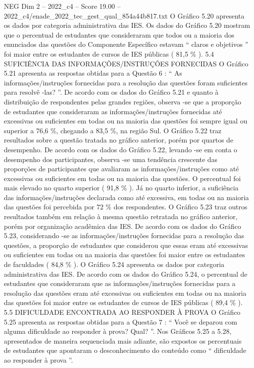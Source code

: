 \begin{textsample}{NEG Dim 2 – 2022\_c4 – Score 19.00 – 2022\_c4/enade\_2022\_tec\_gest\_qual\_854a44b817.txt}
O Gráfico 5.20 apresenta os dados por categoria administrativa das IES.
Os dados do Gráfico 5.20 mostram que o percentual de estudantes que consideraram que todos ou a maioria dos enunciados das questões do Componente Específico estavam “ claros e objetivos ” foi maior entre os estudantes de cursos de IES públicas ( 81,5 \% ). 5.4 SUFICIÊNCIA DAS INFORMAÇÕES/INSTRUÇÕES FORNECIDAS O Gráfico 5.21 apresenta as respostas obtidas para a Questão 6 : “ As informações/instruções fornecidas para a resolução das questões foram suficientes para resolvê -las? ”.
De acordo com os dados do Gráfico 5.21 e quanto à distribuição de respondentes pelas grandes regiões, observa -se que a proporção de estudantes que consideraram as informações/instruções fornecidas até excessivas ou suficientes em todas ou na maioria das questões foi sempre igual ou superior a 76,6 \%, chegando a 83,5 \%, na região Sul.
O Gráfico 5.22 traz resultados sobre a questão tratada no gráfico anterior, porém por quartos de desempenho.
De acordo com os dados do Gráfico 5.22, levando -se em conta o desempenho dos participantes, observa -se uma tendência crescente das proporções de participantes que avaliaram as informações/instruções como até excessivas ou suficientes em todas ou na maioria das questões.
O percentual foi mais elevado no quarto superior ( 91,8 \% ).
Já no quarto inferior, a suficiência das informações/instruções declarada como até excessiva, em todas ou na maioria das questões foi percebida por 72 \% dos respondentes.
O Gráfico 5.23 traz outros resultados também em relação à mesma questão retratada no gráfico anterior, porém por organização acadêmica das IES.
De acordo com os dados do Gráfico 5.23, considerando -se as informações/instruções fornecidas para a resolução das questões, a proporção de estudantes que considerou que essas eram até excessivas ou suficientes em todas ou na maioria das questões foi maior entre os estudantes de faculdades ( 84,8 \% ).
O Gráfico 5.24 apresenta os dados por categoria administrativa das IES.
De acordo com os dados do Gráfico 5.24, o percentual de estudantes que consideraram que as informações/instruções fornecidas para a resolução das questões eram até excessivas ou suficientes em todas ou na maioria das questões foi maior entre os estudantes de cursos de IES públicas ( 89,4 \% ). 5.5 DIFICULDADE ENCONTRADA AO RESPONDER À PROVA O Gráfico 5.25 apresenta as respostas obtidas para a Questão 7 : “ Você se deparou com alguma dificuldade ao responder à prova?
Qual? ”.
Nos Gráficos 5.25 a 5.28, apresentados de maneira sequenciada mais adiante, são expostos os percentuais de estudantes que apontaram o desconhecimento do conteúdo como “ dificuldade ao responder à prova ”.

\end{textsample}
